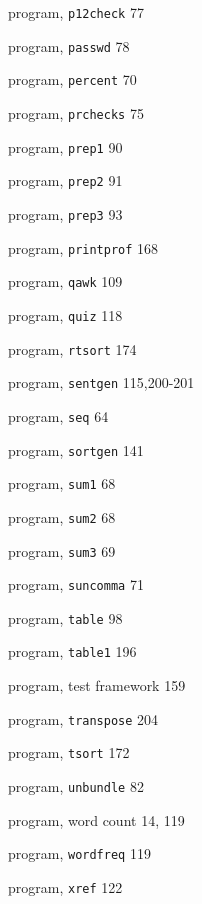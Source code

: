 \begin{multicols}{3}
\hangindent=3pc  program, \verb'p12check' 77

\hangindent=3pc  program, \verb'passwd' 78

\hangindent=3pc  program, \verb'percent' 70

\hangindent=3pc  program, \verb'prchecks' 75

\hangindent=3pc  program, \verb'prep1' 90

\hangindent=3pc  program, \verb'prep2' 91

\hangindent=3pc  program, \verb'prep3' 93

\hangindent=3pc  program, \verb'printprof' 168

\hangindent=3pc  program, \verb'qawk' 109

\hangindent=3pc  program, \verb'quiz' 118

\hangindent=3pc  program, \verb'rtsort' 174

\hangindent=3pc  program, \verb'sentgen' 115,200-201

\hangindent=3pc  program, \verb'seq' 64

\hangindent=3pc  program, \verb'sortgen' 141

\hangindent=3pc  program, \verb'sum1' 68

\hangindent=3pc  program, \verb'sum2' 68

\hangindent=3pc  program, \verb'sum3' 69



\hangindent=3pc  program, \verb'suncomma' 71

\hangindent=3pc  program, \verb'table' 98

\hangindent=3pc  program, \verb'table1' 196

\hangindent=3pc  program, test framework 159

\hangindent=3pc  program, \verb'transpose' 204

\hangindent=3pc  program, \verb'tsort' 172

\hangindent=3pc  program, \verb'unbundle' 82

\hangindent=3pc  program, word count 14, 119

\hangindent=3pc  program, \verb'wordfreq' 119

\hangindent=3pc  program, \verb'xref' 122


\end{multicols}
